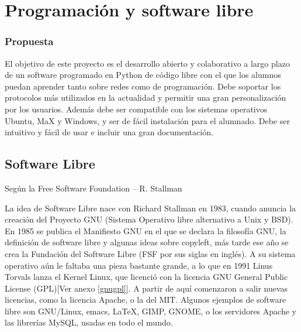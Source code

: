 \documentclass[a4paper, 11pt]{report} %
\begin{document}
\setcounter{chapter}{0}    
\chapter{Programación y software libre}

\subsection*{Propuesta}
El objetivo de este proyecto es el desarrollo abierto  y colaborativo a largo plazo de un software programado en Python de código libre con el que los alumnos puedan aprender tanto sobre redes como de programación. Debe soportar los protocolos más utilizados en la actualidad y permitir una gran personalización por los usuarios. Además debe ser compatible con los sistemas operativos Ubuntu, MaX y Windows, y ser de fácil instalación para el alumnado. Debe ser intuitivo y fácil de usar e incluir una gran documentación.

\section{Software Libre}
Según la Free Software Foundation
-- R. Stallman \cite{FSF-Ph}

La idea de Software Libre nace con Richard Stallman en 1983, cuando anuncia la creación del Proyecto GNU (Sistema Operativo libre alternativo a Unix y BSD). En 1985 se publica el Manifiesto GNU en el que se declara la filosofía GNU, la definición de software libre y algunas ideas sobre copyleft, más tarde ese año se crea la Fundación del Software Libre (FSF por sus siglas en inglés).
A su sistema operativo aún le faltaba una pieza bastante grande, a lo que en 1991 Linus Torvals lanza el Kernel Linux, que licenció con la licencia GNU General Public License (GPL)[Ver anexo \ref{gnugpl}]. A partir de aquí comenzaron a salir nuevas licencias, como la licencia Apache, o la del MIT. Algunos ejemplos de software libre son GNU/Linux, emacs, LaTeX, GIMP, GNOME, o los servidores Apache y las librerías MySQL, usadas en todo el mundo.
\end{document}
